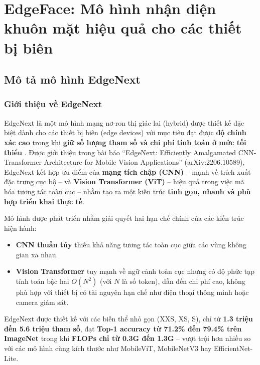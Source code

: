 \section{EdgeFace: Mô hình nhận diện khuôn mặt hiệu quả cho các thiết bị biên}
\label{sec:edgeface-lessons}


\subsection{Mô tả mô hình EdgeNext}

\subsubsection{Giới thiệu về EdgeNext}

EdgeNext là một mô hình mạng nơ-ron thị giác lai (hybrid) được thiết kế đặc biệt dành cho các thiết bị biên (edge devices) với mục tiêu đạt được \textbf{độ chính xác cao} trong khi \textbf{giữ số lượng tham số và chi phí tính toán ở mức tối thiểu} \cite{maaz2022edgenext}. Được giới thiệu trong bài báo ``EdgeNext: Efficiently Amalgamated CNN-Transformer Architecture for Mobile Vision Applications'' (arXiv:2206.10589), EdgeNext kết hợp ưu điểm của \textbf{mạng tích chập (CNN)} -- mạnh về trích xuất đặc trưng cục bộ -- và \textbf{Vision Transformer (ViT)} -- hiệu quả trong việc mã hóa tương tác toàn cục -- nhằm tạo ra một kiến trúc \textbf{tinh gọn, nhanh và phù hợp triển khai thực tế}.

Mô hình được phát triển nhằm giải quyết hai hạn chế chính của các kiến trúc hiện hành:
\begin{itemize}
    \item \textbf{CNN thuần túy} thiếu khả năng tương tác toàn cục giữa các vùng không gian xa nhau.
    \item \textbf{Vision Transformer} tuy mạnh về ngữ cảnh toàn cục nhưng có độ phức tạp tính toán bậc hai $O(N^2)$ (với $N$ là số token), dẫn đến chi phí cao, không phù hợp với thiết bị có tài nguyên hạn chế như điện thoại thông minh hoặc camera giám sát.
\end{itemize}

EdgeNext được thiết kế với các biến thể nhỏ gọn (XXS, XS, S), chỉ từ \textbf{1.3 triệu đến 5.6 triệu tham số}, đạt \textbf{Top-1 accuracy từ 71.2\% đến 79.4\% trên ImageNet} trong khi \textbf{FLOPs chỉ từ 0.3G đến 1.3G} -- vượt trội hơn nhiều so với các mô hình cùng kích thước như MobileViT, MobileNetV3 hay EfficientNet-Lite.

